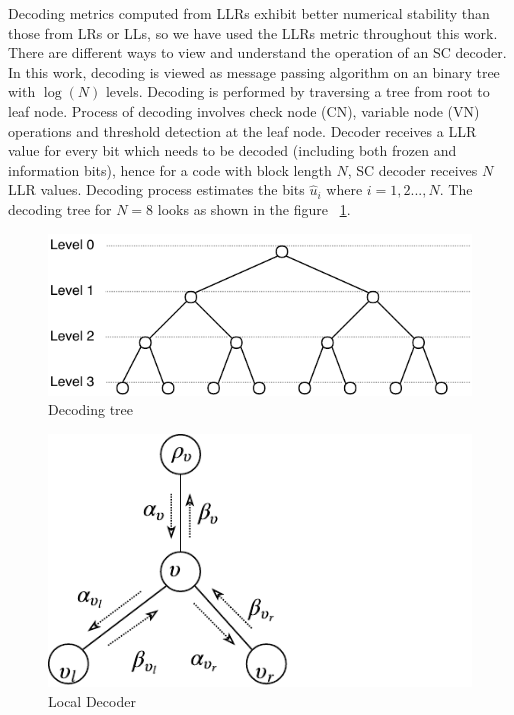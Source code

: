 Decoding metrics computed from LLRs exhibit better numerical stability than those from LRs or LLs, so we have used the LLRs metric throughout this work. There are different ways to view and understand the operation of an SC decoder. In this work, decoding is viewed as message passing algorithm on an binary tree with $\log(N)$ levels. Decoding is performed by traversing a tree from root to leaf node. Process of decoding involves check node (CN), variable node (VN) operations and threshold detection at the leaf node. Decoder receives a LLR value for every bit which needs to be decoded (including both frozen and information bits), hence for a code with block length $N$, SC decoder receives $N$ LLR values. Decoding process estimates the bits $\hat{u}_{i} $  where $i = 1,2...,N$. The decoding tree for $N = 8$ looks as shown in the figure ~\ref{fig:decodingTree}.

\begin{figure}[h]
	\centering
	\includegraphics{./figures/decodingTree.pdf}
	\caption{Decoding tree}
	\label{fig:decodingTree}
\end{figure}

\begin{figure}[h]
	\centering
	\includegraphics{./figures/messagePassingDiaS.pdf}
	\caption{Local Decoder}
	\label{fig:msgPassingDia}
\end{figure}

